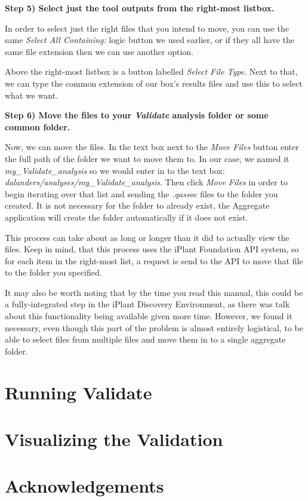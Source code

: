 \documentclass[twoside,a4paper]{refart}
\begin{document}
\textbf{Step 5) Select just the tool outputs from the right-most listbox.}

In order to select just the right files that you intend to move, you can use the same \textit{Select All Containing:} logic button we used earlier, or if they all have the same file extension then we can use another option.

Above the right-most listbox is a button labelled \textit{Select File Type}. Next to that, we can type the common extension of our box's results files and use this to select what we want.

\textbf{Step 6) Move the files to your \textit{Validate} analysis folder or some common folder.}

Now, we can move the files. In the text box next to the \textit{Move Files} button enter the full path of the folder we want to move them to. In our case, we named it \textit{my\_Validate\_analysis} so we would enter in to the text box: \textit{dalanders/analyses/my\_Validate\_analysis}. Then click \textit{Move Files} in order to begin iterating over that list and sending the \textit{.qassoc} files to the folder you created. It is not necessary for the folder to already exist, the Aggregate application will create the folder automatically if it does not exist.

This process can take about as long or longer than it did to actually view the files. Keep in mind, that this process uses the iPlant Foundation API system, so for each item in the right-most list, a request is send to the API to move that file to the folder you specified. 

It may also be worth noting that by the time you read this manual, this could be a fully-integrated step in the iPlant Discovery Environment, as there was talk about this functionality being available given more time. However, we found it necessary, even though this part of the problem is almost entirely logistical, to be able to select files from multiple files and move them in to a single aggregate folder.

\section{Running Validate} 

\section{Visualizing the Validation}

\section{Acknowledgements}
\end{document}
